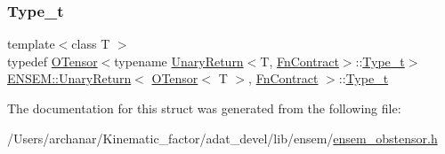 \subsubsection{\texorpdfstring{Type\_t}{Type\_t}\hspace{0.1cm}{\footnotesize\ttfamily [2/2]}}
{\footnotesize\ttfamily template$<$class T $>$ \\
typedef \mbox{\hyperlink{classENSEM_1_1OTensor}{O\+Tensor}}$<$typename \mbox{\hyperlink{structENSEM_1_1UnaryReturn}{Unary\+Return}}$<$T, \mbox{\hyperlink{structENSEM_1_1FnContract}{Fn\+Contract}}$>$\+::\mbox{\hyperlink{structENSEM_1_1UnaryReturn_3_01OTensor_3_01T_01_4_00_01FnContract_01_4_a5b94783dc2f622ca8629f6318a2332ac}{Type\+\_\+t}}$>$ \mbox{\hyperlink{structENSEM_1_1UnaryReturn}{E\+N\+S\+E\+M\+::\+Unary\+Return}}$<$ \mbox{\hyperlink{classENSEM_1_1OTensor}{O\+Tensor}}$<$ T $>$, \mbox{\hyperlink{structENSEM_1_1FnContract}{Fn\+Contract}} $>$\+::\mbox{\hyperlink{structENSEM_1_1UnaryReturn_3_01OTensor_3_01T_01_4_00_01FnContract_01_4_a5b94783dc2f622ca8629f6318a2332ac}{Type\+\_\+t}}}



The documentation for this struct was generated from the following file\+:\begin{DoxyCompactItemize}
\item 
/\+Users/archanar/\+Kinematic\+\_\+factor/adat\+\_\+devel/lib/ensem/\mbox{\hyperlink{lib_2ensem_2ensem__obstensor_8h}{ensem\+\_\+obstensor.\+h}}\end{DoxyCompactItemize}
